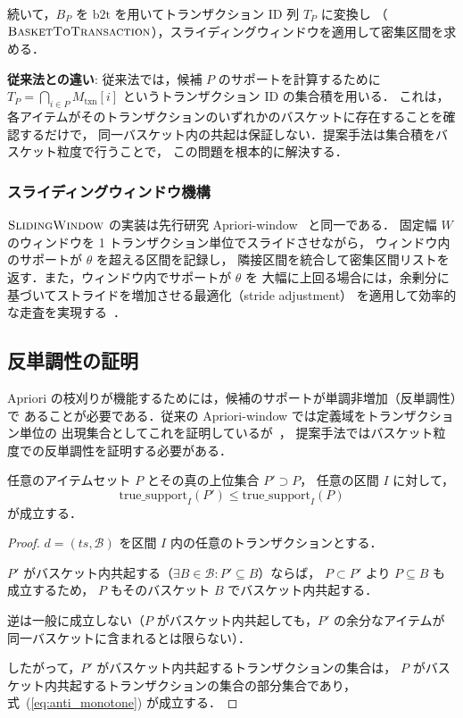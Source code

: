 続いて，$B_P$ を $\text{b2t}$ を用いてトランザクション ID 列 $T_P$ に変換し
（$\Call{BasketToTransaction}{}$），スライディングウィンドウを適用して密集区間を求める．

\textbf{従来法との違い}: 従来法では，候補 $P$ のサポートを計算するために
$T_P = \bigcap_{i \in P} M_{\text{txn}}[i]$ というトランザクション ID の集合積を用いる．
これは，各アイテムがそのトランザクションのいずれかのバスケットに存在することを確認するだけで，
同一バスケット内の共起は保証しない．提案手法は集合積をバスケット粒度で行うことで，
この問題を根本的に解決する．

\subsubsection{スライディングウィンドウ機構}

$\Call{SlidingWindow}{}$ の実装は先行研究 Apriori-window~\cite{dsaa2025} と同一である．
固定幅 $W$ のウィンドウを 1 トランザクション単位でスライドさせながら，
ウィンドウ内のサポートが $\theta$ を超える区間を記録し，
隣接区間を統合して密集区間リストを返す．また，ウィンドウ内でサポートが $\theta$ を
大幅に上回る場合には，余剰分に基づいてストライドを増加させる最適化（stride adjustment）
を適用して効率的な走査を実現する~\cite{dsaa2025}．

\subsection{反単調性の証明}
\label{sec:anti_monotone}

Apriori の枝刈りが機能するためには，候補のサポートが単調非増加（反単調性）で
あることが必要である．従来の Apriori-window では定義域をトランザクション単位の
出現集合としてこれを証明しているが~\cite{dsaa2025}，
提案手法ではバスケット粒度での反単調性を証明する必要がある．

\begin{theorem}[バスケット内共起における反単調性]
\label{thm:anti_monotone}
任意のアイテムセット $P$ とその真の上位集合 $P' \supset P$，
任意の区間 $I$ に対して，
\begin{equation}
\text{true\_support}_I(P') \leq \text{true\_support}_I(P)
\label{eq:anti_monotone}
\end{equation}
が成立する．
\end{theorem}

\begin{proof}
$d = (ts, \mathcal{B})$ を区間 $I$ 内の任意のトランザクションとする．

$P'$ がバスケット内共起する（$\exists B \in \mathcal{B}: P' \subseteq B$）ならば，
$P \subset P'$ より $P \subseteq B$ も成立するため，
$P$ もそのバスケット $B$ でバスケット内共起する．

逆は一般に成立しない（$P$ がバスケット内共起しても，$P'$ の余分なアイテムが
同一バスケットに含まれるとは限らない）．

したがって，$P'$ がバスケット内共起するトランザクションの集合は，
$P$ がバスケット内共起するトランザクションの集合の部分集合であり，
式~(\ref{eq:anti_monotone}) が成立する．
\end{proof}

